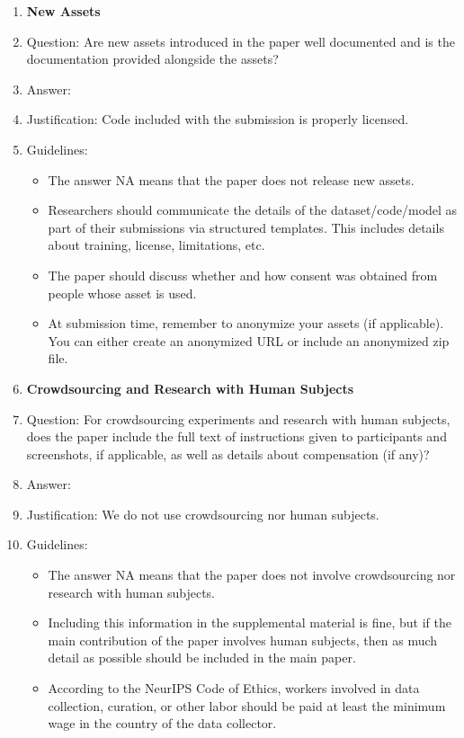 \documentclass{article}
\begin{document}
\begin{enumerate}
\item {\bf New Assets}
    \item[] Question: Are new assets introduced in the paper well documented and is the documentation provided alongside the assets?
    \item[] Answer: \answerYes{} %
    \item[] Justification: Code included with the submission is properly licensed.
    \item[] Guidelines:
    \begin{itemize}
        \item The answer NA means that the paper does not release new assets.
        \item Researchers should communicate the details of the dataset/code/model as part of their submissions via structured templates. This includes details about training, license, limitations, etc. 
        \item The paper should discuss whether and how consent was obtained from people whose asset is used.
        \item At submission time, remember to anonymize your assets (if applicable). You can either create an anonymized URL or include an anonymized zip file.
    \end{itemize}

\item {\bf Crowdsourcing and Research with Human Subjects}
    \item[] Question: For crowdsourcing experiments and research with human subjects, does the paper include the full text of instructions given to participants and screenshots, if applicable, as well as details about compensation (if any)? 
    \item[] Answer: \answerNA{} %
    \item[] Justification: We do not use crowdsourcing nor human subjects.
    \item[] Guidelines:
    \begin{itemize}
        \item The answer NA means that the paper does not involve crowdsourcing nor research with human subjects.
        \item Including this information in the supplemental material is fine, but if the main contribution of the paper involves human subjects, then as much detail as possible should be included in the main paper. 
        \item According to the NeurIPS Code of Ethics, workers involved in data collection, curation, or other labor should be paid at least the minimum wage in the country of the data collector. 
    \end{itemize}


\end{enumerate}
\end{document}
